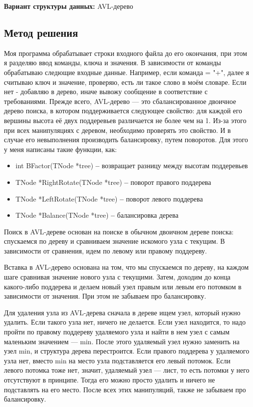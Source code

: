 \documentclass[12pt]{article}
\begin{document}
\textbf{Вариант структуры данных:} AVL-дерево

\subsection*{Метод решения}

Моя программа обрабатывает строки входного файла до его окончания, при этом я разделяю ввод команды, ключа и значения. В зависимости от команды обрабатываю следющие входные данные. Например, если команда = "+", далее я считываю ключ и значение, проверяю, есть ли такое слово в моём словаре. Если нет - добавляю в дерево, иначе вывожу сообщение в соответствие с требованиями. 
Прежде всего, AVL-дерево — это сбалансированное двоичное дерево поиска, в котором поддерживается следующее свойство: для каждой его вершины высота её двух поддеревьев различается не более чем на 1. Из-за этого при всех манипуляциях с деревом, необходимо проверять это свойство. И в случае его невыполнения производить балансировку, путем поворотов. Для этого у меня написаны такие функции, как:
\begin{itemize}
\item int BFactor(TNode *tree) \textbf{--} возвращает разницу между высотам поддеревьев  
\item TNode *RightRotate(TNode *tree) \textbf{--} поворот правого поддерева
\item TNode *LeftRotate(TNode *tree) \textbf{--} поворот левого поддерева
\item TNode *Balance(TNode *tree) \textbf{--} балансировка дерева
\end{itemize}

Поиск в AVL-дереве основан на поиске в обычном двоичном дереве поиска: спускаемся по дереву и сравниваем значение искомого узла с текущим. В зависимости от сравнения, идем по левому или правому поддереву.

Вставка в AVL-дерево основана на том, что мы спускаемся по дереву, на каждом шаге сравнивая значение нового узла с текущими. Затем, доходим до конца какого-либо поддерева и делаем новый узел правым или левым его потомком в зависимости от значения. При этом не забываем про балансировку.

Для удаления узла из AVL-дерева сначала в дереве ищем узел, который нужно удалить. Если такого узла нет, ничего не делается. Если узел находится, то надо пройти по правому поддереву удаляемого узла и найти в нем узел с самым маленьким значением —  min. После этого удаляемый узел нужно заменить на узел min, и структура дерева перестроится. Если правого поддерева у удаляемого узла нет, вместо min на место узла подставляется его левый потомок. Если левого потомка тоже нет, значит, удаляемый узел — лист, то есть потомки у него отсутствуют в принципе. Тогда его можно просто удалить и ничего не подставлять на его место. После всех этих манипуляций, также не забываем про балансировку.
\end{document}
